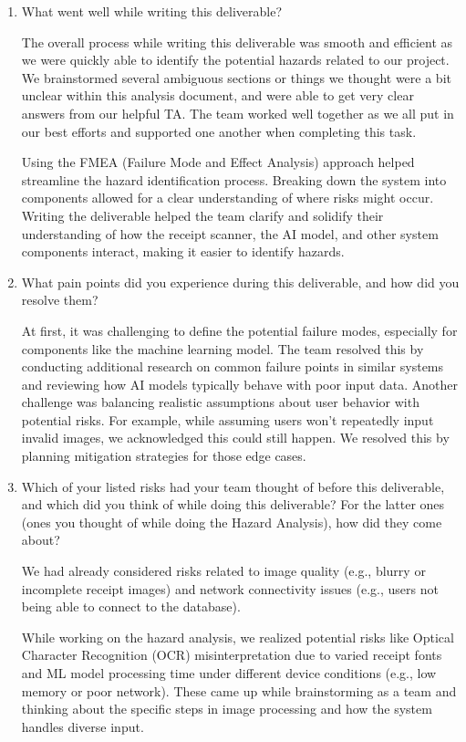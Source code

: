 \documentclass{article}
\begin{document}
\begin{enumerate}

\item What went well while writing this deliverable?

The overall process while writing this deliverable was smooth and efficient as
we were quickly able to identify the potential hazards related to our project.
We brainstormed several ambiguous sections or things we thought were a bit
unclear within this analysis document, and were able to get very clear answers
from our helpful TA. The team worked well together as we all put in our best
efforts and supported one another when completing this task. 

Using the FMEA (Failure Mode and Effect Analysis) approach helped streamline the
hazard identification process. Breaking down the system into components allowed
for a clear understanding of where risks might occur. Writing the deliverable
helped the team clarify and solidify their understanding of how the receipt
scanner, the AI model, and other system components interact, making it easier to
identify hazards.

\item What pain points did you experience during this deliverable, and how did
you resolve them?

At first, it was challenging to define the potential failure modes, especially
for components like the machine learning model. The team resolved this by
conducting additional research on common failure points in similar systems and
reviewing how AI models typically behave with poor input data. Another challenge
was balancing realistic assumptions about user behavior with potential risks.
For example, while assuming users won’t repeatedly input invalid images, we
acknowledged this could still happen. We resolved this by planning mitigation
strategies for those edge cases.

\item Which of your listed risks had your team thought of before this
deliverable, and which did you think of while doing this deliverable? For the
latter ones (ones you thought of while doing the Hazard Analysis), how did they
come about?

We had already considered risks related to image quality (e.g., blurry or
incomplete receipt images) and network connectivity issues (e.g., users not
being able to connect to the database).

While working on the hazard analysis, we realized potential risks like Optical
Character Recognition (OCR) misinterpretation due to varied receipt fonts and ML
model processing time under different device conditions (e.g., low memory or
poor network). These came up while brainstorming as a team and thinking about
the specific steps in image processing and how the system handles diverse input.


\end{enumerate}
\end{document}
